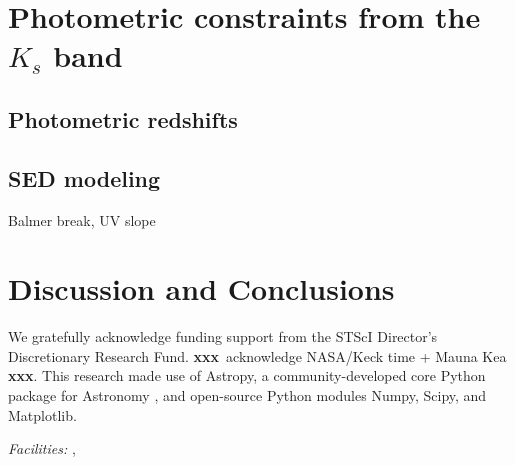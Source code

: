 \documentclass[iop, numberedappendix]{emulateapj}
\gdef\xxx{\textbf{xxx}}
\begin{document}
\section{Photometric constraints from the $K_s$ band}
\label{s:constraints}

\subsection{Photometric redshifts}
\label{s:photoz}

\subsection{SED modeling}
\label{s:sed}

Balmer break, UV slope


\section{Discussion and Conclusions}
\label{s:discussion}


%
%
\vspace{-0.3cm} %
\acknowledgements

\noindent We gratefully acknowledge funding support from the STScI Director's Discretionary Research Fund.  \xxx\ acknowledge NASA/Keck time + Mauna Kea \xxx. This research made use of Astropy, a community-developed core Python package for Astronomy \citep{astropy}, and open-source Python modules Numpy, Scipy, and Matplotlib. 


{\it Facilities:} ,  %



\end{document}
